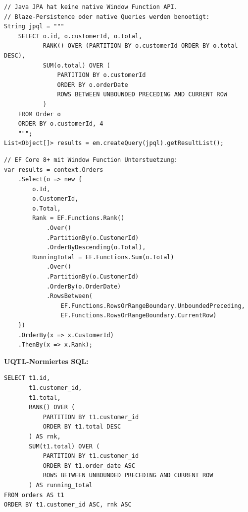 \begin{lstlisting}[style=javastyle, caption={Beispiel 5 -- Java (Window via JPQL / Blaze-Persistence)},
  label=lst:bsp5_java]
// Java JPA hat keine native Window Function API.
// Blaze-Persistence oder native Queries werden benoetigt:
String jpql = """
    SELECT o.id, o.customerId, o.total,
           RANK() OVER (PARTITION BY o.customerId ORDER BY o.total DESC),
           SUM(o.total) OVER (
               PARTITION BY o.customerId
               ORDER BY o.orderDate
               ROWS BETWEEN UNBOUNDED PRECEDING AND CURRENT ROW
           )
    FROM Order o
    ORDER BY o.customerId, 4
    """;
List<Object[]> results = em.createQuery(jpql).getResultList();
\end{lstlisting}

\begin{lstlisting}[style=csharpstyle, caption={Beispiel 5 -- C\# (EF Core Window Functions)},
  label=lst:bsp5_cs]
// EF Core 8+ mit Window Function Unterstuetzung:
var results = context.Orders
    .Select(o => new {
        o.Id,
        o.CustomerId,
        o.Total,
        Rank = EF.Functions.Rank()
            .Over()
            .PartitionBy(o.CustomerId)
            .OrderByDescending(o.Total),
        RunningTotal = EF.Functions.Sum(o.Total)
            .Over()
            .PartitionBy(o.CustomerId)
            .OrderBy(o.OrderDate)
            .RowsBetween(
                EF.Functions.RowsOrRangeBoundary.UnboundedPreceding,
                EF.Functions.RowsOrRangeBoundary.CurrentRow)
    })
    .OrderBy(x => x.CustomerId)
    .ThenBy(x => x.Rank);
\end{lstlisting}

\begin{successbox}
\textbf{UQTL-Normiertes SQL:}
\begin{lstlisting}[style=sqlstyle, numbers=none]
SELECT t1.id,
       t1.customer_id,
       t1.total,
       RANK() OVER (
           PARTITION BY t1.customer_id
           ORDER BY t1.total DESC
       ) AS rnk,
       SUM(t1.total) OVER (
           PARTITION BY t1.customer_id
           ORDER BY t1.order_date ASC
           ROWS BETWEEN UNBOUNDED PRECEDING AND CURRENT ROW
       ) AS running_total
FROM orders AS t1
ORDER BY t1.customer_id ASC, rnk ASC
\end{lstlisting}
\end{successbox}

